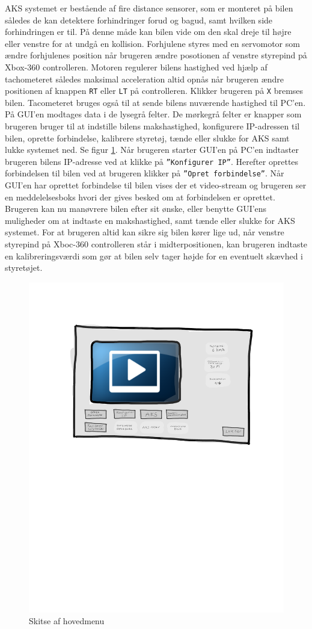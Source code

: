 AKS systemet er bestående af fire distance sensorer, som er monteret på bilen således de kan detektere forhindringer forud og bagud, samt hvilken side forhindringen er til. På denne måde kan bilen vide om den skal dreje til højre eller venstre for at undgå en kollision. Forhjulene styres med en servomotor som ændre forhjulenes position når brugeren ændre posotionen af venstre styrepind på Xbox-360 controlleren. Motoren regulerer bilens hastighed ved hjælp af tachometeret således maksimal acceleration altid opnås når brugeren ændre positionen af knappen \texttt{RT} eller \texttt{LT} på controlleren. Klikker brugeren på \texttt{X} bremses bilen. Tacometeret bruges også til at sende bilens nuværende hastighed til PC'en. På GUI'en modtages data i de lysegrå felter. De mørkegrå felter er knapper som brugeren bruger til at indstille bilens makshastighed, konfigurere IP-adressen til bilen, oprette forbindelse, kalibrere styretøj, tænde eller slukke for AKS samt lukke systemet ned. Se figur \ref{fig:main_menu}. Når brugeren starter GUI'en på PC'en indtaster brugeren bilens IP-adresse ved at klikke på \texttt{''Konfigurer IP''}. Herefter oprettes forbindelsen til bilen ved at brugeren klikker på \texttt{''Opret forbindelse''}. Når GUI'en har oprettet forbindelse til bilen vises der et video-stream og brugeren ser en meddelelsesboks hvori der gives besked om at forbindelsen er oprettet. Brugeren kan nu manøvrere bilen efter sit ønske, eller benytte GUI'ens muligheder om at indtaste en makshastighed, samt tænde eller slukke for AKS systemet. For at brugeren altid kan sikre sig bilen kører lige ud, når venstre styrepind på Xboc-360 controlleren står i midterpositionen, kan brugeren indtaste en kalibreringsværdi som gør at bilen selv tager højde for en eventuelt skævhed i styretøjet.


\begin{figure}[h]
\centering
\includegraphics[width=\textwidth*2/3]{../fig/gui/hovedmenu}
\caption{Skitse af hovedmenu}
\label{fig:main_menu}
\end{figure}
